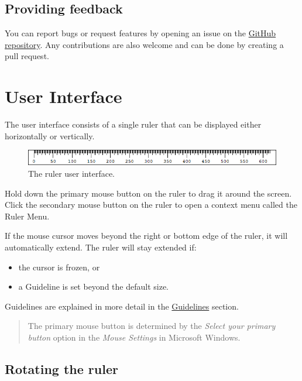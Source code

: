 \documentclass[
]{book}
\providecommand{\tightlist}{%
  \setlength{\itemsep}{0pt}\setlength{\parskip}{0pt}}
\begin{document}
\section{Providing feedback}\label{providing-feedback}

You can report bugs or request features by opening an issue on the \href{https://github.com/Cossey/ScreenPixelRuler2}{GitHub repository}.
Any contributions are also welcome and can be done by creating a pull request.

\chapter{User Interface}\label{ui}

The user interface consists of a single ruler that can be displayed either horizontally or vertically.

\begin{figure}
\centering
\includegraphics{images/ruler.png}
\caption{\label{fig:unnamed-chunk-1}The ruler user interface.}
\end{figure}

Hold down the primary mouse button on the ruler to drag it around the screen.
Click the secondary mouse button on the ruler to open a context menu called the Ruler Menu.

If the mouse cursor moves beyond the right or bottom edge of the ruler, it will automatically extend.
The ruler will stay extended if:

\begin{itemize}
\tightlist
\item
  the cursor is frozen, or
\item
  a Guideline is set beyond the default size.
\end{itemize}

Guidelines are explained in more detail in the \hyperref[guidelines]{Guidelines} section.

\begin{quote}
The primary mouse button is determined by the \emph{Select your primary button} option in the \emph{Mouse Settings} in Microsoft Windows.
\end{quote}

\section{Rotating the ruler}\label{rotate}
\end{document}
